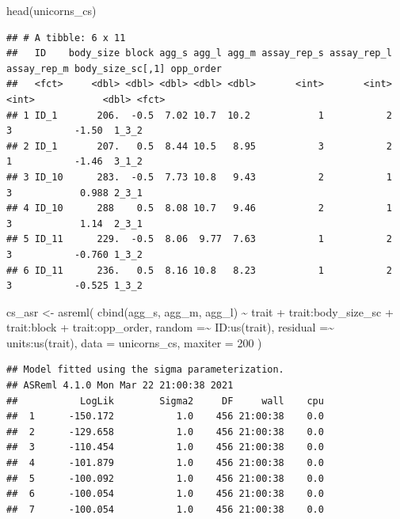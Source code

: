 \documentclass[
  12pt,
]{book}
\newenvironment{Shaded}{\begin{snugshade}}{\end{snugshade}}
\newcommand{\AttributeTok}[1]{\textcolor[rgb]{0.77,0.63,0.00}{#1}}
\newcommand{\DecValTok}[1]{\textcolor[rgb]{0.00,0.00,0.81}{#1}}
\newcommand{\FunctionTok}[1]{\textcolor[rgb]{0.00,0.00,0.00}{#1}}
\newcommand{\NormalTok}[1]{#1}
\newcommand{\OtherTok}[1]{\textcolor[rgb]{0.56,0.35,0.01}{#1}}
\newcommand{\SpecialCharTok}[1]{\textcolor[rgb]{0.00,0.00,0.00}{#1}}
\begin{document}
\begin{Shaded}
\begin{Highlighting}[]
\FunctionTok{head}\NormalTok{(unicorns\_cs)}
\end{Highlighting}
\end{Shaded}

\begin{verbatim}
## # A tibble: 6 x 11
##   ID    body_size block agg_s agg_l agg_m assay_rep_s assay_rep_l assay_rep_m body_size_sc[,1] opp_order
##   <fct>     <dbl> <dbl> <dbl> <dbl> <dbl>       <int>       <int>       <int>            <dbl> <fct>    
## 1 ID_1       206.  -0.5  7.02 10.7  10.2            1           2           3           -1.50  1_3_2    
## 2 ID_1       207.   0.5  8.44 10.5   8.95           3           2           1           -1.46  3_1_2    
## 3 ID_10      283.  -0.5  7.73 10.8   9.43           2           1           3            0.988 2_3_1    
## 4 ID_10      288    0.5  8.08 10.7   9.46           2           1           3            1.14  2_3_1    
## 5 ID_11      229.  -0.5  8.06  9.77  7.63           1           2           3           -0.760 1_3_2    
## 6 ID_11      236.   0.5  8.16 10.8   8.23           1           2           3           -0.525 1_3_2
\end{verbatim}

\begin{Shaded}
\begin{Highlighting}[]
\NormalTok{cs\_asr }\OtherTok{\textless{}{-}} \FunctionTok{asreml}\NormalTok{(}
  \FunctionTok{cbind}\NormalTok{(agg\_s, agg\_m, agg\_l) }\SpecialCharTok{\textasciitilde{}}\NormalTok{ trait }\SpecialCharTok{+}\NormalTok{ trait}\SpecialCharTok{:}\NormalTok{body\_size\_sc }\SpecialCharTok{+}
\NormalTok{    trait}\SpecialCharTok{:}\NormalTok{block }\SpecialCharTok{+}
\NormalTok{    trait}\SpecialCharTok{:}\NormalTok{opp\_order,}
  \AttributeTok{random =}\SpecialCharTok{\textasciitilde{}}\NormalTok{ ID}\SpecialCharTok{:}\FunctionTok{us}\NormalTok{(trait),}
  \AttributeTok{residual =}\SpecialCharTok{\textasciitilde{}}\NormalTok{ units}\SpecialCharTok{:}\FunctionTok{us}\NormalTok{(trait),}
  \AttributeTok{data =}\NormalTok{ unicorns\_cs,}
  \AttributeTok{maxiter =} \DecValTok{200}
\NormalTok{)}
\end{Highlighting}
\end{Shaded}

\begin{verbatim}
## Model fitted using the sigma parameterization.
## ASReml 4.1.0 Mon Mar 22 21:00:38 2021
##           LogLik        Sigma2     DF     wall    cpu
##  1      -150.172           1.0    456 21:00:38    0.0
##  2      -129.658           1.0    456 21:00:38    0.0
##  3      -110.454           1.0    456 21:00:38    0.0
##  4      -101.879           1.0    456 21:00:38    0.0
##  5      -100.092           1.0    456 21:00:38    0.0
##  6      -100.054           1.0    456 21:00:38    0.0
##  7      -100.054           1.0    456 21:00:38    0.0
\end{verbatim}
\end{document}
